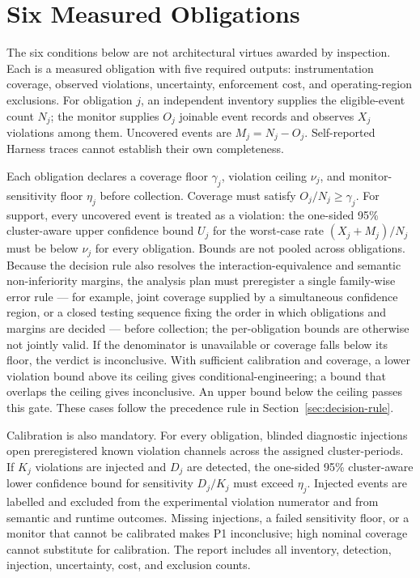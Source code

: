 \documentclass[11pt]{article}
\begin{document}
\section{Six Measured Obligations}
\label{sec:obligations}

The six conditions below are not architectural virtues awarded by inspection. Each is a measured obligation with five required outputs: instrumentation coverage, observed violations, uncertainty, enforcement cost, and operating-region exclusions. For obligation $j$, an independent inventory supplies the eligible-event count $N_j$; the monitor supplies $O_j$ joinable event records and observes $X_j$ violations among them. Uncovered events are $M_j=N_j-O_j$. Self-reported Harness traces cannot establish their own completeness.

Each obligation declares a coverage floor $\gamma_j$, violation ceiling $\nu_j$, and monitor-sensitivity floor $\eta_j$ before collection. Coverage must satisfy $O_j/N_j\geq\gamma_j$. For support, every uncovered event is treated as a violation: the one-sided 95\% cluster-aware upper confidence bound $U_j$ for the worst-case rate $(X_j+M_j)/N_j$ must be below $\nu_j$ for every obligation. Bounds are not pooled across obligations. Because the decision rule also resolves the interaction-equivalence and semantic non-inferiority margins, the analysis plan must preregister a single family-wise error rule --- for example, joint coverage supplied by a simultaneous confidence region, or a closed testing sequence fixing the order in which obligations and margins are decided --- before collection; the per-obligation bounds are otherwise not jointly valid. If the denominator is unavailable or coverage falls below its floor, the verdict is inconclusive. With sufficient calibration and coverage, a lower violation bound above its ceiling gives conditional-engineering; a bound that overlaps the ceiling gives inconclusive. An upper bound below the ceiling passes this gate. These cases follow the precedence rule in Section~\ref{sec:decision-rule}.

Calibration is also mandatory. For every obligation, blinded diagnostic injections open preregistered known violation channels across the assigned cluster-periods. If $K_j$ violations are injected and $D_j$ are detected, the one-sided 95\% cluster-aware lower confidence bound for sensitivity $D_j/K_j$ must exceed $\eta_j$. Injected events are labelled and excluded from the experimental violation numerator and from semantic and runtime outcomes. Missing injections, a failed sensitivity floor, or a monitor that cannot be calibrated makes P1 inconclusive; high nominal coverage cannot substitute for calibration. The report includes all inventory, detection, injection, uncertainty, cost, and exclusion counts.
\end{document}
